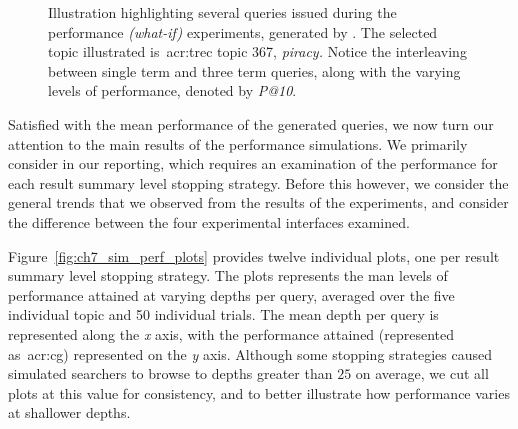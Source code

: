 \begin{figure}[t!]
    \centering
    \caption[Example queries issued]{Illustration highlighting several queries issued during the performance \emph{(what-if)} experiments, generated by . The selected topic illustrated is~\gls{acr:trec} topic 367, \emph{piracy.} Notice the interleaving between single term and three term queries, along with the varying levels of performance, denoted by \emph{P@10}.}
    \label{fig:ch7_example_queries}
\end{figure}

Satisfied with the mean performance of the generated queries, we now turn our attention to the main results of the performance simulations. We primarily consider  in our reporting, which requires an examination of the performance for each result summary level stopping strategy. Before this however, we consider the general trends that we observed from the results of the experiments, and consider the difference between the four experimental interfaces examined.

Figure~\ref{fig:ch7_sim_perf_plots} provides twelve individual plots, one per result summary level stopping strategy. The plots represents the man levels of performance attained at varying depths per query, averaged over the five individual topic and 50 individual trials. The mean depth per query is represented along the \emph{x} axis, with the performance attained (represented as~\gls{acr:cg}) represented on the \emph{y} axis. Although some stopping strategies caused simulated searchers to browse to depths greater than $25$ on average, we cut all plots at this value for consistency, and to better illustrate how performance varies at shallower depths.

